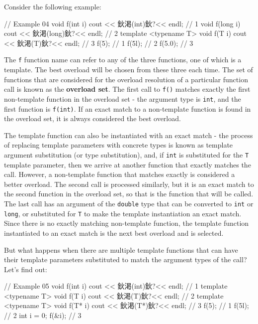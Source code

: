 Consider the following example:

\begin{code}
// Example 04
void f(int i) { cout << 鈥渇(int)鈥?<< endl; }        // 1
void f(long i) { cout << 鈥渇(long)鈥?<< endl; }    // 2
template <typename T>
void f(T i) { cout << 鈥渇(T)鈥?<< endl; }        // 3
f(5);        // 1
f(5l);    // 2
f(5.0);    // 3
\end{code}

The \texttt{f} function name can refer to any of the three functions, one of which is a template. The best overload will be chosen from these three each time. The set of functions that are considered for the overload resolution of a particular function call is known as the \textbf{overload set}. The first call to \texttt{f()} matches exactly the first non-template function in the overload set - the argument type is \texttt{int}, and the first function is \texttt{f(int)}. If an exact match to a non-template function is found in the overload set, it is always considered the best overload.

The template function can also be instantiated with an exact match - the process of replacing template parameters with concrete types is known as template argument substitution (or type substitution), and, if \texttt{int} is substituted for the \texttt{T} template parameter, then we arrive at another function that exactly matches the call. However, a non-template function that matches exactly is considered a better overload. The second call is processed similarly, but it is an exact match to the second function in the overload set, so that is the function that will be called. The last call has an argument of the \texttt{double} type that can be converted to \texttt{int} or \texttt{long}, or substituted for \texttt{T} to make the template instantiation an exact match. Since there is no exactly matching non-template function, the template function instantiated to an exact match is the next best overload and is selected.

But what happens when there are multiple template functions that can have their template parameters substituted to match the argument types of the call? Let's find out:

\begin{code}
// Example 05
void f(int i) { cout << 鈥渇(int)鈥?<< endl; }    // 1
template <typename T>
void f(T i) { cout << 鈥渇(T)鈥?<< endl; }    // 2
template <typename T>
void f(T* i) { cout << 鈥渇(T*)鈥?<< endl; }    // 3
f(5);        // 1
f(5l);    // 2
int i = 0;
f(&i);    // 3
\end{code}

